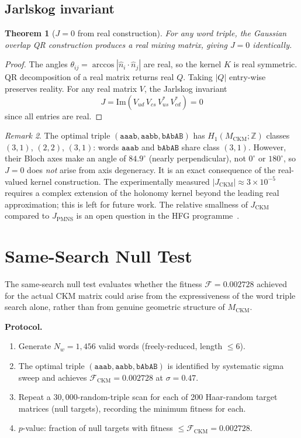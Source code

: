 \documentclass[11pt,a4paper]{article}
\newtheorem{theorem}{Theorem}
\theoremstyle{remark}
\newtheorem{remark}[theorem]{Remark}
\newcommand{\MCKM}{M_{\mathrm{CKM}}}
\newcommand{\ZZ}{\mathbb{Z}}
\begin{document}
\subsection{Jarlskog invariant}

\begin{theorem}[$J=0$ from real construction]
\label{thm:jarlskog}
For any word triple, the Gaussian overlap QR construction produces a
real mixing matrix, giving $J = 0$ identically.
\end{theorem}

\begin{proof}
The angles $\theta_{ij} = \arccos|\hat{n}_i \cdot \hat{n}_j|$ are real,
so the kernel $K$ is real symmetric.
QR decomposition of a real matrix returns real $Q$.
Taking $|Q|$ entry-wise preserves reality.
For any real matrix $V$, the Jarlskog invariant
\[
J = \mathrm{Im}(V_{ud}\,V_{cs}\,V^*_{us}\,V^*_{cd}) = 0
\]
since all entries are real.
\end{proof}

\begin{remark}
The optimal triple $(\mathtt{aaab}, \mathtt{aabb}, \mathtt{bAbAB})$
has $H_1(\MCKM;\ZZ)$ classes $(3,1)$, $(2,2)$, $(3,1)$:
words $\mathtt{aaab}$ and $\mathtt{bAbAB}$ share class $(3,1)$.
However, their Bloch axes make an angle of $84.9^\circ$ (nearly perpendicular),
not $0^\circ$ or $180^\circ$, so $J = 0$ does \emph{not} arise from axis
degeneracy. It is an exact consequence of the real-valued kernel construction.
The experimentally measured $|J_\mathrm{CKM}| \approx 3 \times 10^{-5}$
requires a complex extension of the holonomy kernel beyond the
leading real approximation; this is left for future work.
The relative smallness of $J_\mathrm{CKM}$ compared to $J_\mathrm{PMNS}$
is an open question in the HFG programme~\cite{Gentry:arith}.
\end{remark}

\section{Same-Search Null Test}
\label{sec:null}

The same-search null test evaluates whether the fitness
$\mathcal{F} = 0.002728$ achieved for the actual CKM matrix could
arise from the expressiveness of the word triple search alone,
rather than from genuine geometric structure of $\MCKM$.

\textbf{Protocol.}
\begin{enumerate}[(1)]
\item Generate $N_w = 1{,}456$ valid words (freely-reduced, length $\leq 6$).
\item The optimal triple $(\mathtt{aaab}, \mathtt{aabb}, \mathtt{bAbAB})$
  is identified by systematic sigma sweep and achieves
  $\mathcal{F}_\mathrm{CKM} = 0.002728$ at $\sigma = 0.47$.
\item Repeat a $30{,}000$-random-triple scan for each of 200 Haar-random
  target matrices (null targets), recording the minimum fitness for each.
\item $p$-value: fraction of null targets with fitness
  $\leq \mathcal{F}_\mathrm{CKM} = 0.002728$.
\end{enumerate}
\end{document}
